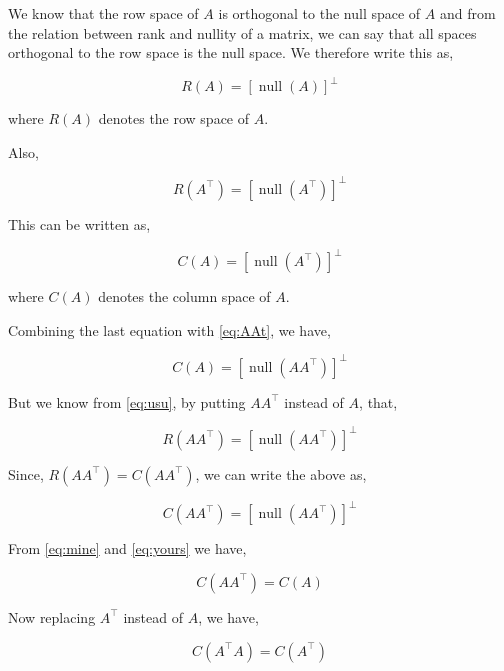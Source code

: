 \documentclass[a4paper]{article}
\begin{document}
We know that the row space of $A$ is orthogonal to the null space of $A$ and from the relation between rank and nullity of a matrix, we can say that all spaces orthogonal to the row space is the null space. We therefore write this as,

\begin{equation}
R(A) = \left[\operatorname{null}(A)\right]^{\perp}
\label{eq:usu}
\end{equation}

where $R(A)$ denotes the row space of $A$.

Also,

\begin{equation}
R(A^{\top}) = \left[\operatorname{null}(A^{\top})\right]^{\perp}
\end{equation}

This can be written as,

\begin{equation}
C(A) = \left[\operatorname{null}(A^{\top})\right]^{\perp}
\end{equation}

where $C(A)$ denotes the column space of $A$.

Combining the last equation with \ref{eq:AAt}, we have,

\begin{equation}
C(A) = \left[\operatorname{null}(AA^{\top})\right]^{\perp}\label{eq:mine}
\end{equation}

But we know from \ref{eq:usu}, by putting $AA^{\top}$ instead of $A$, that,

\begin{equation}
R(AA^{\top}) = \left[\operatorname{null}(AA^{\top})\right]^{\perp}
\end{equation}

Since, $R(AA^{\top})=C(AA^{\top})$, we can write the above as,

\begin{equation}
C(AA^{\top}) = \left[\operatorname{null}(AA^{\top})\right]^{\perp}
\label{eq:yours}
\end{equation}

From \ref{eq:mine} and \ref{eq:yours} we have,

\begin{equation}
C(AA^{\top}) = C(A)
\end{equation}

Now replacing $A^{\top}$ instead of $A$, we have,

\begin{equation}
C(A^{\top}A) = C(A^{\top})
\end{equation}
\end{document}
